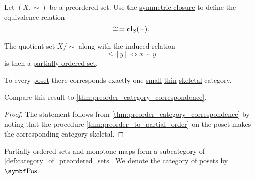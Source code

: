 \begin{proposition}\label{thm:preorder_to_partial_order}
  Let \( (X, \sim) \) be a preordered set. Use the \hyperref[def:derived_relations/symmetric]{symmetric closure} to define the equivalence relation
  \begin{equation*}
    \cong \coloneqq \operatorname{cl}_S(\sim).
  \end{equation*}

  The quotient set \( X / \sim \) along with the induced relation
  \begin{equation*}
    [x] \leq [y] \iff x \sim y
  \end{equation*}
  is then a \hyperref[def:poset]{partially ordered set}.
\end{proposition}

\begin{proposition}\label{thm:partial_order_category_correspondence}
  To every \hyperref[def:poset]{poset} there corresponds exactly one \hyperref[def:category_cardinality]{small} \hyperref[def:thin_category]{thin} \hyperref[def:skeletal_category]{skeletal} category.

  Compare this result to \cref{thm:preorder_category_correspondence}.
\end{proposition}
\begin{proof}
  The statement follows from \cref{thm:preorder_category_correspondence} by noting that the procedure \cref{thm:preorder_to_partial_order} on the poset makes the corresponding category skeletal.
\end{proof}

\begin{definition}\label{def:category_of_posets}
  Partially ordered sets and monotone maps form a subcategory of \cref{def:category_of_preordered_sets}. We denote the category of posets by \( \Cat{Pos} \).
\end{definition}
